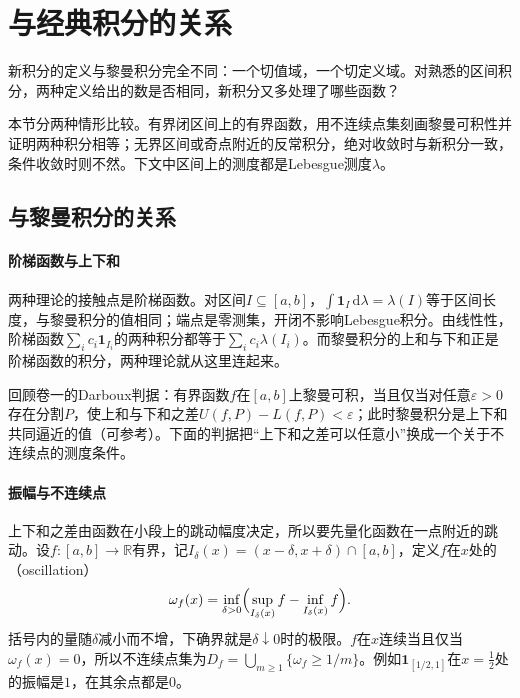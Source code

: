 \section{与经典积分的关系}
\label{sec:integ-classical}

新积分的定义与黎曼积分完全不同：一个切值域，一个切定义域。对熟悉的区间积分，两种定义给出的数是否相同，新积分又多处理了哪些函数？

本节分两种情形比较。有界闭区间上的有界函数，用不连续点集刻画黎曼可积性并证明两种积分相等；无界区间或奇点附近的反常积分，绝对收敛时与新积分一致，条件收敛时则不然。下文中区间上的测度都是Lebesgue测度$\lambda$。

\subsection{与黎曼积分的关系}
\label{sec:integ-riemann}

\paragraph{阶梯函数与上下和}
两种理论的接触点是阶梯函数。对区间$I\subseteq[a,b]$，$\int\mathbf 1_I\,\mathrm d\lambda=\lambda(I)$等于区间长度，与黎曼积分的值相同；端点是零测集，开闭不影响Lebesgue积分。由线性性，阶梯函数$\sum_ic_i\mathbf 1_{I_i}$的两种积分都等于$\sum_ic_i\lambda(I_i)$。而黎曼积分的上和与下和正是阶梯函数的积分，两种理论就从这里连起来。

回顾卷一的Darboux判据：有界函数$f$在$[a,b]$上黎曼可积，当且仅当对任意$\varepsilon>0$存在分割$P$，使上和与下和之差$U(f,P)-L(f,P)<\varepsilon$；此时黎曼积分是上下和共同逼近的值（可参考）。下面的判据把“上下和之差可以任意小”换成一个关于不连续点的测度条件。

\paragraph{振幅与不连续点}
上下和之差由函数在小段上的跳动幅度决定，所以要先量化函数在一点附近的跳动。设$f:[a,b]\to\mathbb R$有界，记$I_\delta(x)=(x-\delta,x+\delta)\cap[a,b]$，定义$f$在$x$处的（oscillation）
\begin{equation}
 \omega_f(x)=\inf_{\delta>0}\Bigl(\sup_{I_\delta(x)}f-\inf_{I_\delta(x)}f\Bigr).
 \label{eq:integ-oscillation}
\end{equation}
括号内的量随$\delta$减小而不增，下确界就是$\delta\downarrow0$时的极限。$f$在$x$连续当且仅当$\omega_f(x)=0$，所以不连续点集为$D_f=\bigcup_{m\geq1}\{\omega_f\geq1/m\}$。例如$\mathbf 1_{[1/2,1]}$在$x=\frac12$处的振幅是$1$，在其余点都是$0$。

